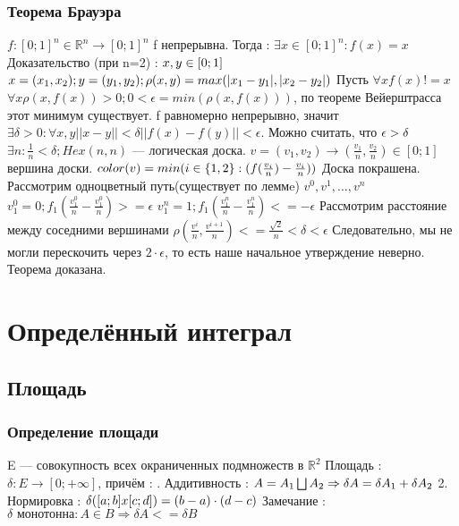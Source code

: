 ﻿\documentclass[12pt, a4paper]{article}
\newcommand{\nl}{\newline}
\begin{document}
        \subsubsection{Теорема Брауэра}
        $f : [0; 1]^n \in \mathbb{R}^n \rightarrow [0; 1]^n$ \nl
        f непрерывна. \nl
        Тогда : $\exists x \in [0; 1]^n : f(x) = x$ \nl
        Доказательство (при n=2) : \nl
        $x, y \in [0; 1] \nl$
        $x = (x_1, x_2); y = (y_1, y_2); \rho(x,y) = max(|x_1-y_1|, |x_2-y_2|) \nl$
        Пусть $ \forall x f(x) != x$ \nl
        $\forall x \rho(x, f(x))>0 ; 0 < \epsilon = min(\rho(x, f(x)))$, по теореме Вейерштрасса этот минимум существует. \nl
        f равномерно непрерывно, значит $\exists \delta > 0 : \forall x,y ||x-y|| < \delta ||f(x)-f(y)|| < \epsilon$. Можно считать, что $\epsilon > \delta \nl$
        $ \exists n : \frac{1}{n} < \delta; Hex(n , n)$ — логическая доска.
        $v = (v_1, v_2) \rightarrow (\frac{v_1}{n}, \frac{v_2}{n}) \in [0; 1]$ вершина доски. \nl
        $color(v) = min(i \in \{1, 2\} : (f(\frac{v_i}{n})-\frac{v_i}{n})) \nl$ 
        Доска покрашена. \nl
        Рассмотрим одноцветный путь(существует по леммe) $v^0, v^1, \ldots , v^n$ \nl
        $v^0_1 = 0; f_1(\frac{v^0_1}{n}-\frac{v^0_1}{n}) >=\epsilon$ \nl
        $v^n_1 = 1; f_1(\frac{v^n_1}{n}-\frac{v^n_1}{n}) <=-\epsilon$ \nl
        Рассмотрим расстояние между соседними вершинами \nl
        $\rho(\frac{v^i}{n}, \frac{v^{i+1}}{n}) <= \frac{\sqrt{2}}{n} < \delta < \epsilon$ \nl
        Следовательно, мы не могли перескочить через $2 \cdot \epsilon$, то есть наше начальное утверждение неверно. \nl
        Теорема доказана.
        
\section{Определённый интеграл}
    \subsection{Площадь}
        \subsubsection{Определение площади}
        E — совокупность всех окраниченных подмножеств в $\mathbb{R}^2$ \nl
        Площадь : $\delta : E \rightarrow [0; +\infty]$, причём : \nl
        1. Аддитивность : $A = A_1 \bigsqcup A_2 \Rightarrow \delta A = \delta A_1 + \delta A_2 \nl$
        2. Нормировка : $\delta([a; b] x [c; d]) = (b-a) \cdot (d-c) \nl$
            Замечание : $\delta \text{ монотонна} : A \in B \Rightarrow \delta A <= \delta B$
        
\end{document}
